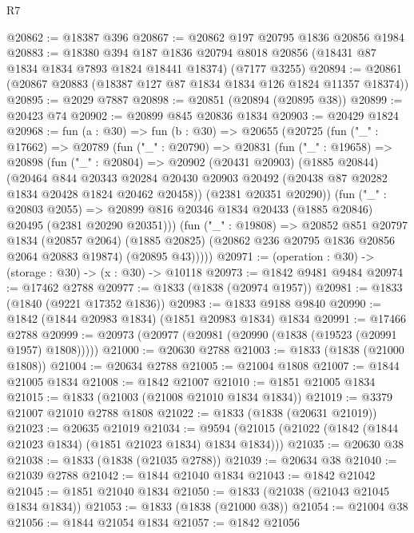 \begin{lexlean}{R7}
\begin{coremodule}
@20862 := @18387 @396
@20867 := @20862 @197 @20795 @1836 @20856 @1984
@20883 := @18380
    @394
    @187
    @1836
    @20794
    @8018
    @20856
    (@18431 @87 @1834 @1834 @7893 @1824 @18441 @18374)
    (@7177 @3255)
@20894 := @20861 (@20867 @20883 (@18387 @127 @87 @1834 @1834 @126 @1824 @11357 @18374))
@20895 := @2029 @7887
@20898 := @20851 (@20894 (@20895 @38))
@20899 := @20423 @74
@20902 := @20899 @845 @20836 @1834
@20903 := @20429 @1824
@20968 := fun (a : @30) =>
  fun (b : @30) =>
  @20655
    (@20725
      (fun ("_" : @17662) =>
      @20789
        (fun ("_" : @20790) =>
        @20831
          (fun ("_" : @19658) =>
          @20898
            (fun ("_" : @20804) =>
            @20902
              (@20431 @20903)
              (@1885 @20844)
              (@20464
                @844
                @20343
                @20284
                @20430
                @20903
                @20492
                (@20438 @87 @20282 @1834 @20428 @1824 @20462 @20458))
              (@2381 @20351 @20290))
            (fun ("_" : @20803 @2055) =>
            @20899 @816 @20346 @1834 @20433 (@1885 @20846) @20495 (@2381 @20290 @20351)))
          (fun ("_" : @19808) =>
          @20852
            @851
            @20797
            @1834
            (@20857 @2064)
            (@1885 @20825)
            (@20862 @236 @20795 @1836 @20856 @2064 @20883 @19874)
            (@20895 @43)))))
@20971 := (operation : @30) -> (storage : @30) -> (x : @30) -> @10118
@20973 := @1842 @9481 @9484
@20974 := @17462 @2788
@20977 := @1833 (@1838 (@20974 @1957))
@20981 := @1833 (@1840 (@9221 @17352 @1836))
@20983 := @1833 @9188 @9840
@20990 := @1842 (@1844 @20983 @1834) (@1851 @20983 @1834) @1834
@20991 := @17466 @2788
@20999 := @20973 (@20977 (@20981 (@20990 (@1838 (@19523 (@20991 @1957) @1808)))))
@21000 := @20630 @2788
@21003 := @1833 (@1838 (@21000 @1808))
@21004 := @20634 @2788
@21005 := @21004 @1808
@21007 := @1844 @21005 @1834
@21008 := @1842 @21007
@21010 := @1851 @21005 @1834
@21015 := @1833 (@21003 (@21008 @21010 @1834 @1834))
@21019 := @3379 @21007 @21010 @2788 @1808
@21022 := @1833 (@1838 (@20631 @21019))
@21023 := @20635 @21019
@21034 := @9594 (@21015 (@21022 (@1842 (@1844 @21023 @1834) (@1851 @21023 @1834) @1834 @1834)))
@21035 := @20630 @38
@21038 := @1833 (@1838 (@21035 @2788))
@21039 := @20634 @38
@21040 := @21039 @2788
@21042 := @1844 @21040 @1834
@21043 := @1842 @21042
@21045 := @1851 @21040 @1834
@21050 := @1833 (@21038 (@21043 @21045 @1834 @1834))
@21053 := @1833 (@1838 (@21000 @38))
@21054 := @21004 @38
@21056 := @1844 @21054 @1834
@21057 := @1842 @21056

\end{coremodule}
\end{lexlean}
